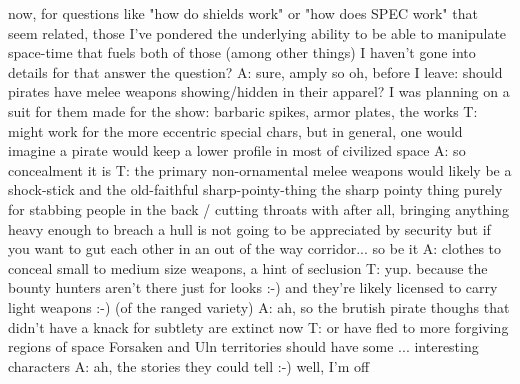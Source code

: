 now, for questions like "how do shields work" or "how does SPEC work" that seem related, those I've pondered
the underlying ability to be able to manipulate space-time that fuels both of those (among other things) I haven't gone into details for
that answer the question?
A: sure, amply so
oh, before I leave: should pirates have melee weapons showing/hidden in their apparel?
I was planning on a suit for them made for the show: barbaric spikes, armor plates, the works
T: might work for the more eccentric special chars, but in general, one would imagine a pirate would keep a lower profile in most of civilized space
A: so concealment it is
T: the primary non-ornamental melee weapons would likely be a shock-stick and the old-faithful sharp-pointy-thing
the sharp pointy thing purely for stabbing people in the back / cutting throats with
after all, bringing anything heavy enough to breach a hull is not going to be appreciated by security
but if you want to gut each other in an out of the way corridor... so be it
A: clothes to conceal small to medium size weapons, a hint of seclusion
T: yup.
because the bounty hunters aren't there just for looks :-)
and they're likely licensed to carry light weapons :-)
(of the ranged variety)
A: ah, so the brutish pirate thoughs that didn't have a knack for subtlety are extinct now
T: or have fled to more forgiving regions of space
Forsaken and Uln territories should have some ... interesting characters
A: ah, the stories they could tell :-) well, I'm off

